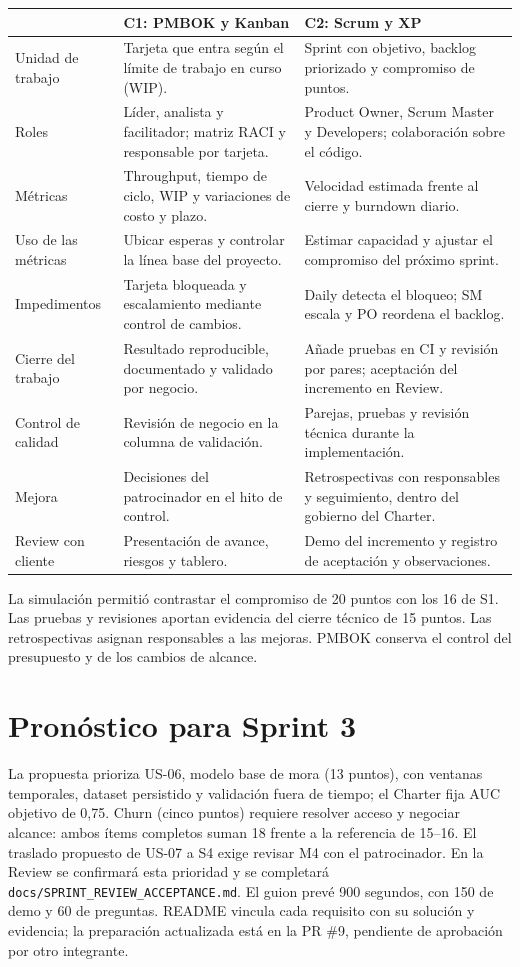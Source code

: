 \documentclass[10pt,a4paper]{article}
\begin{document}
{\footnotesize
\begin{tabularx}{\linewidth}{@{}>{\raggedright\arraybackslash}p{2.5cm} L L@{}}
\toprule
 & C1: PMBOK y Kanban & C2: Scrum y XP \\
\midrule
Unidad de trabajo & Tarjeta que entra según el límite de trabajo en curso (WIP). & Sprint con objetivo, backlog priorizado y compromiso de puntos. \\
Roles & Líder, analista y facilitador; matriz RACI y responsable por tarjeta. & Product Owner, Scrum Master y Developers; colaboración sobre el código. \\
Métricas & Throughput, tiempo de ciclo, WIP y variaciones de costo y plazo. & Velocidad estimada frente al cierre y burndown diario. \\
Uso de las métricas & Ubicar esperas y controlar la línea base del proyecto. & Estimar capacidad y ajustar el compromiso del próximo sprint. \\
Impedimentos & Tarjeta bloqueada y escalamiento mediante control de cambios. & Daily detecta el bloqueo; SM escala y PO reordena el backlog. \\
Cierre del trabajo & Resultado reproducible, documentado y validado por negocio. & Añade pruebas en CI y revisión por pares; aceptación del incremento en Review. \\
Control de calidad & Revisión de negocio en la columna de validación. & Parejas, pruebas y revisión técnica durante la implementación. \\
Mejora & Decisiones del patrocinador en el hito de control. & Retrospectivas con responsables y seguimiento, dentro del gobierno del Charter. \\
Review con cliente & Presentación de avance, riesgos y tablero. & Demo del incremento y registro de aceptación y observaciones. \\
\bottomrule
\end{tabularx}}

La simulación permitió contrastar el compromiso de 20 puntos con los 16 de S1. Las pruebas y revisiones
aportan evidencia del cierre técnico de 15 puntos. Las retrospectivas asignan responsables a las mejoras.
PMBOK conserva el control del presupuesto y de los cambios de alcance.

\section{Pronóstico para Sprint 3}
La propuesta prioriza US-06, modelo base de mora (13 puntos), con ventanas temporales, dataset persistido
y validación fuera de tiempo; el Charter fija AUC objetivo de 0,75. Churn (cinco puntos) requiere resolver
acceso y negociar alcance: ambos ítems completos suman 18 frente a la referencia de 15--16. El traslado
propuesto de US-07 a S4 exige revisar M4 con el patrocinador. En la Review se confirmará esta prioridad
y se completará \texttt{docs/SPRINT\_REVIEW\_ACCEPTANCE.md}. El guion prevé 900 segundos, con 150 de demo y
60 de preguntas. \mbox{README} vincula cada requisito con su solución y evidencia; la preparación actualizada
está en la PR \#9, pendiente de aprobación por otro integrante.
\end{document}
